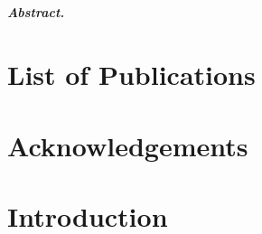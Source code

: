 \documentclass[10pt,twoside]{book}
\begin{document}
\frontmatter

\maketitle

{
  \centering
  {\small\sc\@department}\\[-1mm]
  {\small\sc\@institution}\\
  \vspace{1.2em}
  {\fontsize{16}{17.5}\selectfont\@title\unskip\strut\par}
  \vspace{1.8em}
  {\large\emph\@author}\\
  \vspace{0.7em}
}
\paragraph{Abstract.} 

\chapter*{List of Publications}


\chapter*{Acknowledgements}


\tableofcontents

\mainmatter

\chapter*{Introduction}
\label{chap:intro}

\end{document}

